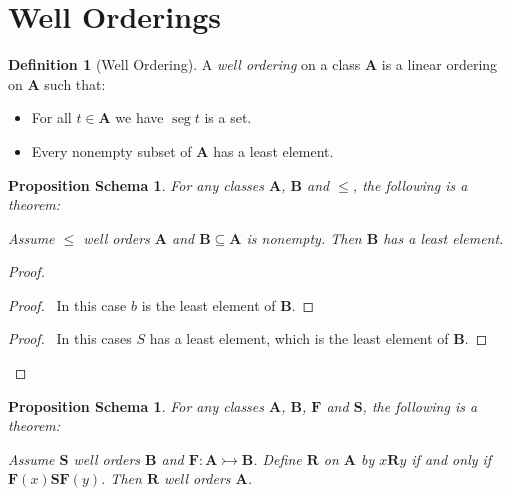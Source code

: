 \documentclass{book}
\let\qed\relax
\newtheorem{props}[ax]{Proposition Schema}
\theoremstyle{definition}
\newtheorem{df}[ax]{Definition}
\newcommand{\seg}{\ensuremath{\operatorname{seg}}}
\begin{document}
\section{Well Orderings}

\begin{df}[Well Ordering]
A \emph{well ordering} on a class $\mathbf{A}$ is a linear ordering on $\mathbf{A}$ such that:
\begin{itemize}
\item For all $t \in \mathbf{A}$ we have $\seg t$ is a set.
\item Every nonempty subset of $\mathbf{A}$ has a least element.
\end{itemize}
\end{df}

\begin{props}
\label{prop:leastelement}
For any classes $\mathbf{A}$, $\mathbf{B}$ and $\leq$, the following is a theorem:

Assume $\leq$ well orders $\mathbf{A}$ and $\mathbf{B} \subseteq \mathbf{A}$ is nonempty. Then $\mathbf{B}$ has a least element.
\end{props}

\begin{proof}
\pf
{}
\step{2}{\pflet{$S = \seg b \cap \mathbf{B}$}}
\begin{proof}
	\pf\ In this case $b$ is the least element of $\mathbf{B}$.
\end{proof}
\begin{proof}
	\pf\ In this cases $S$ has a least element, which is the least element of $\mathbf{B}$.
\end{proof}
\qed
\end{proof}

\begin{props}
For any classes $\mathbf{A}$, $\mathbf{B}$, $\mathbf{F}$ and $\mathbf{S}$, the following is a theorem:

Assume $\mathbf{S}$ well orders $\mathbf{B}$ and $\mathbf{F} : \mathbf{A} \rightarrowtail \mathbf{B}$. Define $\mathbf{R}$ on $\mathbf{A}$ by $x \mathbf{R} y$ if and only if $\mathbf{F}(x) \mathbf{S} \mathbf{F}(y)$. Then $\mathbf{R}$ well orders $\mathbf{A}$.
\end{props}
\end{document}
